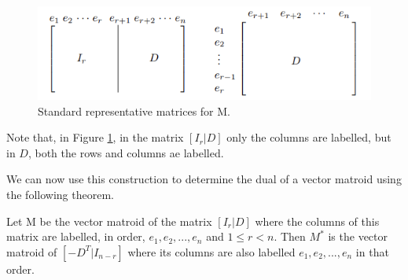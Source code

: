 \begin{figure}[H]
    \centering
    \includegraphics{SRF.png}
    \caption{Standard representative matrices for M. \cite{oxley1}}
    \label{StandertRepMat}
\end{figure}
Note that, in Figure \ref{StandertRepMat}, in the matrix $[I_r|D]$ only the columns are labelled, but in $D$, both the rows and columns ae labelled.

We can now use this construction to determine the dual of a vector matroid using the following theorem.

\begin{theorem}\label{DualRepMat}
    Let M be the vector matroid of the matrix $[I_r|D]$ where the columns of this matrix are labelled, in order, $e_1, e_2,...,e_n$ and $1\leq r< n$. Then $M^*$ is the vector matroid of $[-D^T|I_{n-r}]$ where its columns are also labelled $e_1, e_2,...,e_n$ in that order.
\end{theorem}

